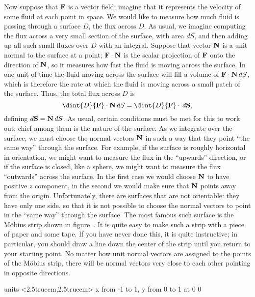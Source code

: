 Now suppose that ${\bf F}$ is a vector field; imagine that it
represents the velocity of some fluid at each point in space. We would
like to measure how much fluid is passing through a surface $D$, the
{\dfont flux\/} across $D$. As usual, we imagine computing
the flux across a very small section of the surface, with area $dS$,
and then adding up all such small fluxes over $D$ with an
integral. Suppose that vector $\bf N$ is a unit normal to the surface
at a point; ${\bf F}\cdot{\bf N}$ is the scalar projection of $\bf F$
onto the direction of $\bf N$, so it measures how fast the fluid is
moving across the surface. In one unit of time the fluid moving across
the surface will fill a volume of ${\bf F}\cdot{\bf N}\,dS$, which is
therefore the rate at which the fluid is moving across a small patch
of the surface. Thus, the total flux across $D$ is
$$\dint{D} {\bf F}\cdot{\bf N}\,dS=\dint{D} {\bf F}\cdot\,d{\bf S},$$
defining $d{\bf S}={\bf N}\,dS$.
As usual, certain conditions must be met for this to work out; chief
among them is the nature of the surface. As we integrate over the
surface, we must choose the normal vectors $\bf N$ in such a way that
they point ``the same way'' through the surface. For example, if the
surface is roughly horizontal in orientation, we might want to measure
the flux in the ``upwards'' direction, or if the surface is closed,
like a sphere, we might want to measure the flux ``outwards'' across
the surface. In the first case we would choose $\bf N$ to have
positive $z$ component, in the second we would make sure that $\bf N$
points away from the origin. Unfortunately, there are surfaces that
are not {\dfont orientable\/}: they have
only one side, so that it is not possible to choose the normal vectors
to point in the ``same way'' through the surface. The most famous such
surface is the M\"obius strip shown in figure~. It
is quite easy to make such a strip with a piece of paper and some
tape. If you have never done this, it is quite instructive; in
particular, you should draw a line down the center of the strip until
you return to your starting point. No matter how unit normal vectors
are assigned to the points of the M\"obius strip, there will be normal
vectors very close to each other pointing in opposite directions.

\figure
\vbox{\beginpicture
\normalgraphs
\ninepoint
\setcoordinatesystem units <2.5truecm,2.5truecm>
\setplotarea x from -1 to 1, y from 0 to 1
 at 0 0
\endpicture}
\endfigure{A M\"obius strip.
(\expandafter\url\expandafter{\liveurl moebius.html}%
AP\endurl)}

